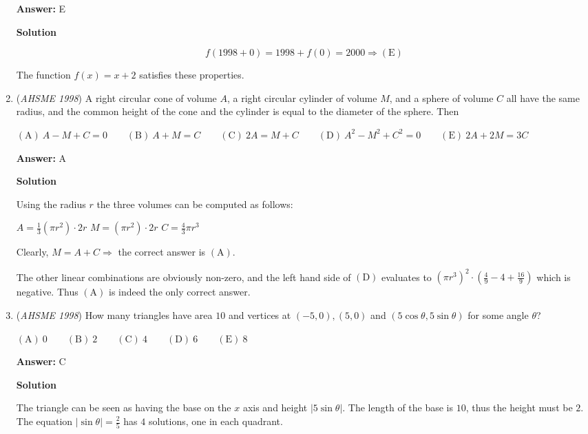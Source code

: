 \begin{enumerate}
 \textbf{Answer: }E



\textbf{Solution}


 \[f(1998 + 0) = 1998 + f(0) = 2000 \Rightarrow \mathrm{(E)}\]

 The function $f(x) = x+2$ satisfies these properties. 

 


	\item (\textit{AHSME 1998}) A right circular cone of volume $A$, a right circular cylinder of volume $M$, and a sphere of volume $C$ all have the same radius, and the common height of the cone and the cylinder is equal to the diameter of the sphere. Then


 $\mathrm{(A) \ } A-M+C = 0 \qquad \mathrm{(B) \ } A+M=C \qquad \mathrm{(C) \ } 2A = M+C \qquad \mathrm{(D) \ }A^2 - M^2 + C^2 = 0 \qquad \mathrm{(E) \ } 2A + 2M = 3C$

 \textbf{Answer: }A



\textbf{Solution}

Using the radius $r$ the three volumes can be computed as follows:

 $A = \frac 13 (\pi r^2) \cdot 2r$
$M = (\pi r^2) \cdot 2r$
$C = \frac 43 \pi r^3$

 Clearly, $M = A+C \Longrightarrow$ the correct answer is $\mathrm{(A)}$.

 The other linear combinations are obviously non-zero, and the left hand side of $\mathrm{(D)}$ evaluates to $(\pi r^3)^2 \cdot \left( \frac 49 - 4 + \frac {16}9 \right)$ which is negative. Thus $\mathrm{(A)}$ is indeed the only correct answer.

 


	\item (\textit{AHSME 1998}) How many triangles have area $10$ and vertices at $(-5,0),(5,0)$ and $(5\cos \theta, 5\sin \theta)$ for some angle $\theta$?


 $\mathrm{(A) \ }0 \qquad \mathrm{(B) \ }2 \qquad \mathrm{(C) \ }4 \qquad \mathrm{(D) \ }6 \qquad \mathrm{(E) \ } 8$

 \textbf{Answer: }C



\textbf{Solution}

The triangle can be seen as having the base on the $x$ axis and height $|5\sin\theta|$. The length of the base is $10$, thus the height must be $2$. The equation $|\sin\theta| = \frac 25$ has $\boxed{4}$ solutions, one in each quadrant.


\end{enumerate}
